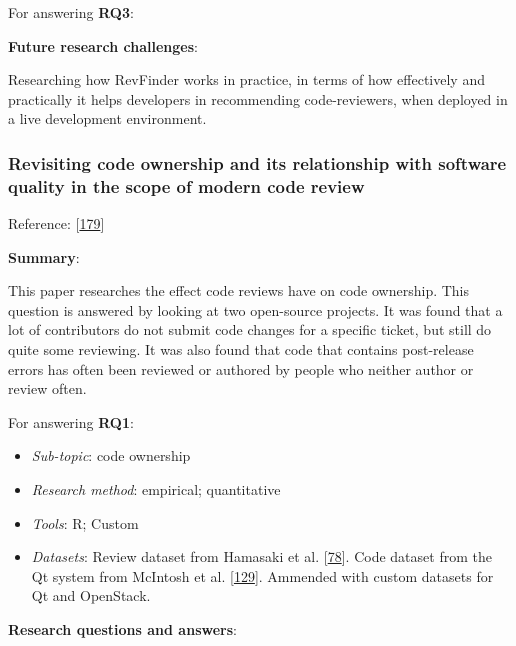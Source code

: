 \documentclass[]{book}
\providecommand{\tightlist}{%
  \setlength{\itemsep}{0pt}\setlength{\parskip}{0pt}}
\begin{document}
For answering \textbf{RQ3}:

\textbf{Future research challenges}:

Researching how RevFinder works in practice, in terms of how effectively
and practically it helps developers in recommending code-reviewers, when
deployed in a live development environment.

\subsubsection{Revisiting code ownership and its relationship with
software quality in the scope of modern code
review}\label{revisiting-code-ownership-and-its-relationship-with-software-quality-in-the-scope-of-modern-code-review}

Reference: {[}\protect\hyperlink{ref-thongtanunam2016revisiting}{179}{]}

\textbf{Summary}:

This paper researches the effect code reviews have on code ownership.
This question is answered by looking at two open-source projects. It was
found that a lot of contributors do not submit code changes for a
specific ticket, but still do quite some reviewing. It was also found
that code that contains post-release errors has often been reviewed or
authored by people who neither author or review often.

For answering \textbf{RQ1}:

\begin{itemize}
\tightlist
\item
  \emph{Sub-topic}: code ownership
\item
  \emph{Research method}: empirical; quantitative
\item
  \emph{Tools}: R; Custom
\item
  \emph{Datasets}: Review dataset from Hamasaki et al.
  {[}\protect\hyperlink{ref-hamasaki2013does}{78}{]}. Code dataset from
  the Qt system from McIntosh et al.
  {[}\protect\hyperlink{ref-mcintosh2014impact}{129}{]}. Ammended with
  custom datasets for Qt and OpenStack.
\end{itemize}

\textbf{Research questions and answers}:
\end{document}
